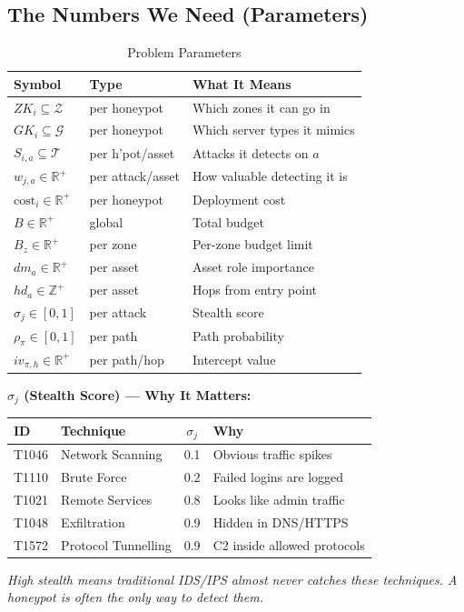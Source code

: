 \documentclass[journal]{IEEEtran}
\newcommand{\calT}{\mathcal{T}}
\newcommand{\calZ}{\mathcal{Z}}
\newcommand{\calG}{\mathcal{G}}
\begin{document}
\subsection{The Numbers We Need (Parameters)}

\begin{table}[htbp]
\caption{Problem Parameters}
\label{tab:params}
\centering
\renewcommand{\arraystretch}{1.2}
\begin{tabular}{@{}lll@{}}
\toprule
\textbf{Symbol} & \textbf{Type} & \textbf{What It Means} \\
\midrule
$ZK_i \subseteq \calZ$         & per honeypot   & Which zones it can go in \\
$GK_i \subseteq \calG$         & per honeypot   & Which server types it mimics \\
$S_{i,a} \subseteq \calT$      & per h'pot/asset& Attacks it detects on $a$ \\
$w_{j,a} \in \mathbb{R}^+$     & per attack/asset& How valuable detecting it is \\
$\mathrm{cost}_i\in\mathbb{R}^+$& per honeypot  & Deployment cost \\
$B \in \mathbb{R}^+$           & global         & Total budget \\
$B_z \in \mathbb{R}^+$         & per zone       & Per-zone budget limit \\
$dm_a \in \mathbb{R}^+$        & per asset      & Asset role importance \\
$hd_a \in \mathbb{Z}^+$        & per asset      & Hops from entry point \\
$\sigma_j \in [0,1]$           & per attack     & Stealth score \\
$\rho_\pi \in [0,1]$           & per path       & Path probability \\
$iv_{\pi,h} \in \mathbb{R}^+$  & per path/hop   & Intercept value \\
\bottomrule
\end{tabular}
\end{table}

\begin{examplebox}
\textbf{$\sigma_j$ (Stealth Score) --- Why It Matters:}
\begin{center}
\small
\renewcommand{\arraystretch}{1.1}
\begin{tabular}{@{}llcl@{}}
\toprule
\textbf{ID} & \textbf{Technique} & $\sigma_j$ & \textbf{Why} \\
\midrule
T1046 & Network Scanning    & 0.1 & Obvious traffic spikes \\
T1110 & Brute Force         & 0.2 & Failed logins are logged \\
T1021 & Remote Services     & 0.8 & Looks like admin traffic \\
T1048 & Exfiltration        & 0.9 & Hidden in DNS/HTTPS \\
T1572 & Protocol Tunnelling & 0.9 & C2 inside allowed protocols \\
\bottomrule
\end{tabular}
\end{center}
\textit{High stealth means traditional IDS/IPS almost never
catches these techniques.
A honeypot is often the \emph{only} way to detect them.}
\end{examplebox}
\end{document}
